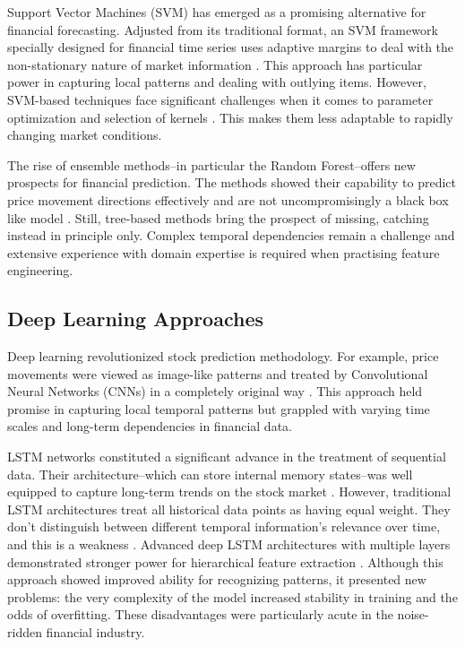 \documentclass[10pt,twocolumn,letterpaper]{article}
\begin{document}
Support Vector Machines (SVM) has emerged as a promising alternative for financial forecasting. Adjusted from its traditional format, an SVM framework specially designed for financial time series uses adaptive margins to deal with the non-stationary nature of market information \cite{tay2001modified}. This approach has particular power in capturing local patterns and dealing with outlying items. However, SVM-based techniques face significant challenges when it comes to parameter optimization and selection of kernels \cite{kumar2006forecasting}. This makes them less adaptable to rapidly changing market conditions.

The rise of ensemble methods--in particular the Random Forest--offers new prospects for financial prediction. The methods showed their capability to predict price movement directions effectively and are not uncompromisingly a black box like model \cite{khaidem2016predicting}. Still, tree-based methods bring the prospect of missing, catching instead in principle only. Complex temporal dependencies remain a challenge and extensive experience with domain expertise is required when practising feature engineering.
\subsection{Deep Learning Approaches}
Deep learning revolutionized stock prediction methodology. For example, price movements were viewed as image-like patterns and treated by Convolutional Neural Networks (CNNs) in a completely original way \cite{zhang2017stock}. This approach held promise in capturing local temporal patterns but grappled with varying time scales and long-term dependencies in financial data.

LSTM networks constituted a significant advance in the treatment of sequential data. Their architecture--which can store internal memory states--was well equipped to capture long-term trends on the stock market \cite{fischer2018deep}. However, traditional LSTM architectures treat all historical data points as having equal weight. They don't distinguish between different temporal information's relevance over time, and this is a weakness \cite{bahdanau2014neural}. Advanced deep LSTM architectures with multiple layers demonstrated stronger power for hierarchical feature extraction \cite{graves2013generating}. Although this approach showed improved ability for recognizing patterns, it presented new problems: the very complexity of the model increased stability in training and the odds of overfitting. These disadvantages were particularly acute in the noise-ridden financial industry.
\end{document}
